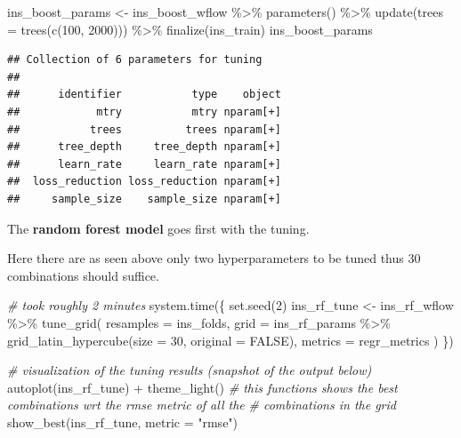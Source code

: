 \documentclass[
]{book}
\newenvironment{Shaded}{\begin{snugshade}}{\end{snugshade}}
\newcommand{\AttributeTok}[1]{\textcolor[rgb]{0.77,0.63,0.00}{#1}}
\newcommand{\CommentTok}[1]{\textcolor[rgb]{0.56,0.35,0.01}{\textit{#1}}}
\newcommand{\ConstantTok}[1]{\textcolor[rgb]{0.00,0.00,0.00}{#1}}
\newcommand{\DecValTok}[1]{\textcolor[rgb]{0.00,0.00,0.81}{#1}}
\newcommand{\FunctionTok}[1]{\textcolor[rgb]{0.00,0.00,0.00}{#1}}
\newcommand{\NormalTok}[1]{#1}
\newcommand{\OtherTok}[1]{\textcolor[rgb]{0.56,0.35,0.01}{#1}}
\newcommand{\SpecialCharTok}[1]{\textcolor[rgb]{0.00,0.00,0.00}{#1}}
\newcommand{\StringTok}[1]{\textcolor[rgb]{0.31,0.60,0.02}{#1}}
\begin{document}
\begin{Shaded}
\begin{Highlighting}[]
\NormalTok{ins\_boost\_params }\OtherTok{\textless{}{-}}\NormalTok{ ins\_boost\_wflow }\SpecialCharTok{\%\textgreater{}\%}
  \FunctionTok{parameters}\NormalTok{() }\SpecialCharTok{\%\textgreater{}\%}
  \FunctionTok{update}\NormalTok{(}\AttributeTok{trees =} \FunctionTok{trees}\NormalTok{(}\FunctionTok{c}\NormalTok{(}\DecValTok{100}\NormalTok{, }\DecValTok{2000}\NormalTok{))) }\SpecialCharTok{\%\textgreater{}\%}
  \FunctionTok{finalize}\NormalTok{(ins\_train)}
\NormalTok{ins\_boost\_params}
\end{Highlighting}
\end{Shaded}

\begin{verbatim}
## Collection of 6 parameters for tuning
## 
##      identifier           type    object
##            mtry           mtry nparam[+]
##           trees          trees nparam[+]
##      tree_depth     tree_depth nparam[+]
##      learn_rate     learn_rate nparam[+]
##  loss_reduction loss_reduction nparam[+]
##     sample_size    sample_size nparam[+]
\end{verbatim}

The \textbf{random forest model} goes first with the tuning.

Here there are as seen above only two hyperparameters to be tuned thus 30 combinations should suffice.

\begin{Shaded}
\begin{Highlighting}[]
\CommentTok{\# took roughly 2 minutes}
\FunctionTok{system.time}\NormalTok{(\{}
  \FunctionTok{set.seed}\NormalTok{(}\DecValTok{2}\NormalTok{)}
\NormalTok{  ins\_rf\_tune }\OtherTok{\textless{}{-}}\NormalTok{ ins\_rf\_wflow }\SpecialCharTok{\%\textgreater{}\%}
    \FunctionTok{tune\_grid}\NormalTok{(}
      \AttributeTok{resamples =}\NormalTok{  ins\_folds,}
      \AttributeTok{grid =}\NormalTok{ ins\_rf\_params }\SpecialCharTok{\%\textgreater{}\%}
        \FunctionTok{grid\_latin\_hypercube}\NormalTok{(}\AttributeTok{size =} \DecValTok{30}\NormalTok{, }\AttributeTok{original =} \ConstantTok{FALSE}\NormalTok{),}
      \AttributeTok{metrics =}\NormalTok{ regr\_metrics}
\NormalTok{    )}
\NormalTok{\})}

\CommentTok{\# visualization of the tuning results (snapshot of the output below)}
\FunctionTok{autoplot}\NormalTok{(ins\_rf\_tune) }\SpecialCharTok{+} \FunctionTok{theme\_light}\NormalTok{()}
\CommentTok{\# this functions shows the best combinations wrt the rmse metric of all the}
\CommentTok{\# combinations in the grid}
\FunctionTok{show\_best}\NormalTok{(ins\_rf\_tune, }\AttributeTok{metric =} \StringTok{"rmse"}\NormalTok{)}
\end{Highlighting}
\end{Shaded}
\end{document}
